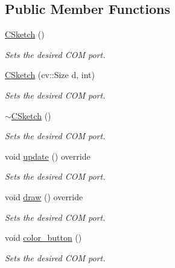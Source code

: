\subsection*{Public Member Functions}
\begin{DoxyCompactItemize}
\item 
\hyperlink{class_c_sketch_a5a822c00631ea5b9402bd76819d772f5}{C\+Sketch} ()
\begin{DoxyCompactList}\small\item\em Sets the desired C\+OM port. \end{DoxyCompactList}\item 
\hyperlink{class_c_sketch_ad18ac5668b3f4994b2114213f656341f}{C\+Sketch} (cv\+::\+Size d, int)
\begin{DoxyCompactList}\small\item\em Sets the desired C\+OM port. \end{DoxyCompactList}\item 
\hyperlink{class_c_sketch_aca8c70005a0bca496ea9574e4da47f65}{$\sim$\+C\+Sketch} ()
\begin{DoxyCompactList}\small\item\em Sets the desired C\+OM port. \end{DoxyCompactList}\item 
void \hyperlink{class_c_sketch_a8b6185fa49d7f9d8909dcffde3cdec3d}{update} () override
\begin{DoxyCompactList}\small\item\em Sets the desired C\+OM port. \end{DoxyCompactList}\item 
void \hyperlink{class_c_sketch_a9db432ca87bbd8c8dfc0b38f274640f6}{draw} () override
\begin{DoxyCompactList}\small\item\em Sets the desired C\+OM port. \end{DoxyCompactList}\item 
void \hyperlink{class_c_sketch_ac604ec5de27ef86c53a07ef999eb2f87}{color\+\_\+button} ()
\begin{DoxyCompactList}\small\item\em Sets the desired C\+OM port. \end{DoxyCompactList}\end{DoxyCompactItemize}
